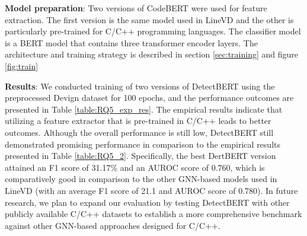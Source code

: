\documentclass{ieeeaccess}
\begin{document}
\par \textbf{Model preparation}: Two versions of CodeBERT \cite{codebert, zhou2023codebertscore} were used  for feature extraction. The first version is the same model used in LineVD and the other is particularly pre-trained  for C/C++ programming languages. The classifier model is a BERT model that contains three transformer encoder layers.  The architecture and training strategy  is described in section \ref{sec:training} and figure \ref{fig:train}

\par \textbf{Results}: We conducted training of two versions of DetectBERT using the preprocessed Devign dataset for 100 epochs, and the performance outcomes are presented in Table \ref{table:RQ5_exp_res}. The empirical results indicate that utilizing a  feature extractor that is pre-trained in C/C++ leads to better outcomes. Although the overall performance is still low, DetectBERT still demonstrated promising performance in comparison to the empirical results presented in Table \ref{table:RQ5_2}. Specifically, the best DertBERT version attained an F1 score of 31.17\% and an AUROC score of 0.760, which is comparatively good in comparison to the other GNN-based models used in LineVD (with an average F1 score of 21.1 and AUROC score of 0.780). In future research, we plan to expand our evaluation by testing DetectBERT with other publicly available C/C++ datasets to establish a more comprehensive benchmark against other GNN-based approaches designed for C/C++.
\end{document}
